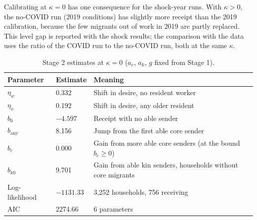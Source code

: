 \documentclass[11pt]{article}
\begin{document}
Calibrating at $\kappa = 0$ has one consequence for the shock-year runs. With $\kappa > 0$, the no-COVID run (2019 conditions) has slightly more receipt than the 2019 calibration, because the few migrants out of work in 2019 are partly replaced. This level gap is reported with the shock results; the comparison with the data uses the ratio of the COVID run to the no-COVID run, both at the same $\kappa$.

\begin{table}[ht]
\centering
\caption{Stage 2 estimates at $\kappa = 0$ ($a_c$, $a_k$, $g$ fixed from Stage 1).}
\label{tab:stage2}
\begin{tabularx}{\linewidth}{llX}
\toprule
Parameter & Estimate & Meaning \\
\midrule
$\eta_w$ & 0.332 & Shift in desire, no resident worker \\
$\eta_o$ & 0.192 & Shift in desire, any older resident \\
$b_0$ & $-4.597$ & Receipt with no able sender \\
$b_{\text{any}}$ & 8.156 & Jump from the first able core sender \\
$b_c$ & 0.000 & Gain from more able core senders (at the bound $b_c \ge 0$) \\
$b_{k0}$ & 9.701 & Gain from able kin senders, households without core migrants \\
\midrule
Log-likelihood & $-1131.33$ & 3,252 households, 756 receiving \\
AIC & 2274.66 & 6 parameters \\
\bottomrule
\end{tabularx}
\end{table}
\end{document}
